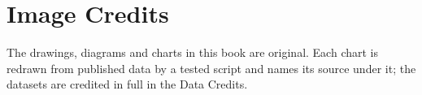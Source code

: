 \chapter*{Image Credits}

The drawings, diagrams and charts in this book are original. Each chart is
redrawn from published data by a tested script and names its source under it;
the datasets are credited in full in the Data Credits.

